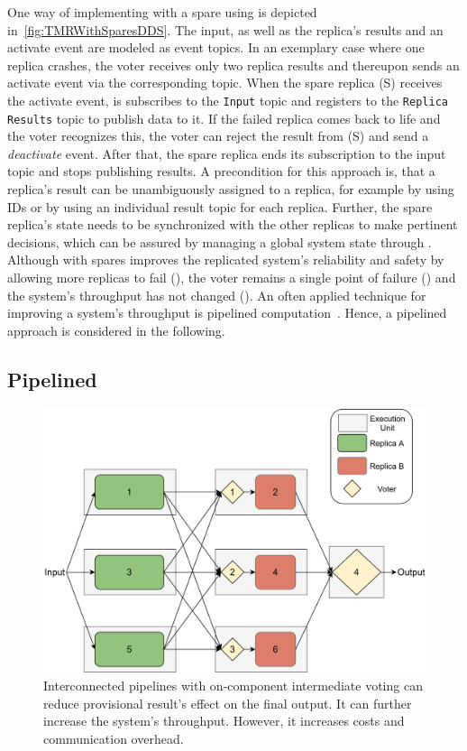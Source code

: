 One way of implementing  with a spare using  is depicted in~\autoref{fig:TMRWithSparesDDS}.
The input, as well as the replica's results and an activate event are modeled as  event topics.
In an exemplary case where one replica crashes, the voter receives only two replica results and thereupon sends an activate event via the corresponding topic.
When the spare replica (S) receives the activate event, is subscribes to the \texttt{Input} topic and registers to the \texttt{Replica Results} topic to publish data to it.
If the failed replica comes back to life and the voter recognizes this, the voter can reject the result from (S) and send a \textit{deactivate} event.
After that, the spare replica ends its subscription to the input topic and stops publishing results.
A precondition for this approach is, that a replica's result can be unambiguously assigned to a replica, for example by using IDs or by using an individual result topic for each replica.
Further, the spare replica's state needs to be synchronized with the other replicas to make pertinent decisions, which can be assured by managing a global system state through .
\\

Although  with spares improves the replicated system's reliability and safety by allowing more replicas to fail (\ChallengeWR), the voter remains a single point of failure (\ChallengeVoter) and the system's throughput has not changed (\ChallengeThrough).
An often applied technique for improving a system's throughput is pipelined computation~\cite{TanenbaumSteen07}.
Hence, a pipelined  approach is considered in the following.

\subsection{Pipelined }
\begin{figure}[!hb]
	\centering
	\includegraphics[width=0.9\linewidth]{images/InterconnectedVoterPipeline}
	\caption{Interconnected pipelines with on-component intermediate voting can reduce provisional result's effect on the final output. It can further increase the system's throughput. However, it increases costs and communication overhead.}
	\label{fig:PipelineIntermediateVoters}
\end{figure}

